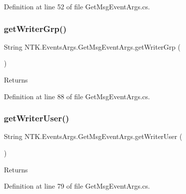Definition at line 52 of file Get\+Msg\+Event\+Args.\+cs.

\mbox{\label{class_n_t_k_1_1_events_args_1_1_get_msg_event_args_a23bbb8f782acd6342f99c4939d7c6b9a}} 
\subsubsection{\texorpdfstring{getWriterGrp()}{getWriterGrp()}}
{\footnotesize\ttfamily String N\+T\+K.\+Events\+Args.\+Get\+Msg\+Event\+Args.\+get\+Writer\+Grp (\begin{DoxyParamCaption}{ }\end{DoxyParamCaption})}





\begin{DoxyReturn}{Returns}

\end{DoxyReturn}


Definition at line 88 of file Get\+Msg\+Event\+Args.\+cs.

\mbox{\label{class_n_t_k_1_1_events_args_1_1_get_msg_event_args_a08ab040d601503381f6ec85aab38da4a}} 
\subsubsection{\texorpdfstring{getWriterUser()}{getWriterUser()}}
{\footnotesize\ttfamily String N\+T\+K.\+Events\+Args.\+Get\+Msg\+Event\+Args.\+get\+Writer\+User (\begin{DoxyParamCaption}{ }\end{DoxyParamCaption})}





\begin{DoxyReturn}{Returns}

\end{DoxyReturn}


Definition at line 79 of file Get\+Msg\+Event\+Args.\+cs.

